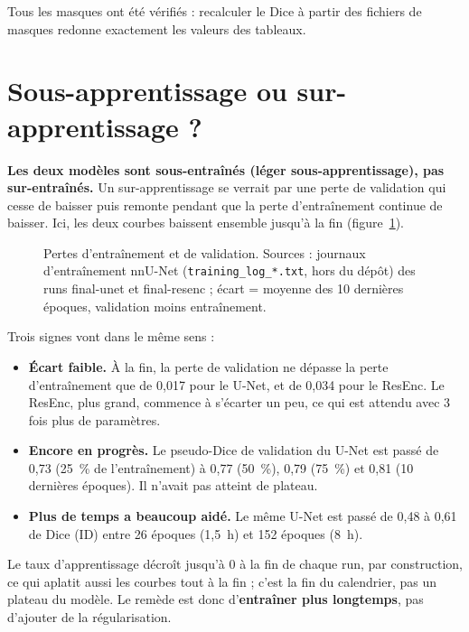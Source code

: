 Tous les masques ont été vérifiés : recalculer le Dice à partir des fichiers de masques redonne exactement les valeurs des tableaux.

\section{Sous-apprentissage ou sur-apprentissage ?}
\label{sec:anas-apprentissage}

{\setlength{\emergencystretch}{2em}%
\textbf{Les deux modèles sont sous-entraînés (léger sous-apprentissage), pas sur-entraînés.}
Un sur-apprentissage se verrait par une perte de validation qui cesse de baisser puis remonte pendant que la perte d'entraînement continue de baisser.
Ici, les deux courbes baissent ensemble jusqu'à la fin (figure~\ref{fig:anas-pertes}).\par}

\begin{figure}[htbp]
  \centering
  \caption{Pertes d'entraînement et de validation. Sources : journaux d'entraînement nnU-Net (\texttt{training\_log\_*.txt}, hors du dépôt) des runs final-unet et final-resenc ; écart = moyenne des 10 dernières époques, validation moins entraînement.}
  \label{fig:anas-pertes}
\end{figure}

Trois signes vont dans le même sens :
\begin{itemize}
  \item \textbf{Écart faible.} À la fin, la perte de validation ne dépasse la perte d'entraînement que de 0,017 pour le U-Net, et de 0,034 pour le ResEnc. Le ResEnc, plus grand, commence à s'écarter un peu, ce qui est attendu avec 3 fois plus de paramètres.
  \item \textbf{Encore en progrès.} Le pseudo-Dice de validation du U-Net est passé de 0,73 (25~\% de l'entraînement) à 0,77 (50~\%), 0,79 (75~\%) et 0,81 (10 dernières époques). Il n'avait pas atteint de plateau.
  \item \textbf{Plus de temps a beaucoup aidé.} Le même U-Net est passé de 0,48 à 0,61 de Dice (ID) entre 26 époques (1,5~h) et 152 époques (8~h).
\end{itemize}

Le taux d'apprentissage décroît jusqu'à 0 à la fin de chaque run, par construction, ce qui aplatit aussi les courbes tout à la fin ; c'est la fin du calendrier, pas un plateau du modèle.
Le remède est donc d'\textbf{entraîner plus longtemps}, pas d'ajouter de la régularisation.

